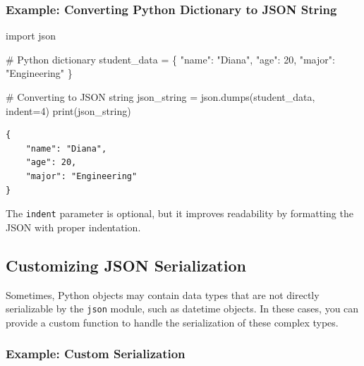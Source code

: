 \documentclass[
  letterpaper,
  DIV=11,
  numbers=noendperiod]{scrreprt}
\newenvironment{Shaded}{\begin{snugshade}}{\end{snugshade}}
\newcommand{\BuiltInTok}[1]{\textcolor[rgb]{0.00,0.23,0.31}{#1}}
\newcommand{\CommentTok}[1]{\textcolor[rgb]{0.37,0.37,0.37}{#1}}
\newcommand{\DecValTok}[1]{\textcolor[rgb]{0.68,0.00,0.00}{#1}}
\newcommand{\ImportTok}[1]{\textcolor[rgb]{0.00,0.46,0.62}{#1}}
\newcommand{\NormalTok}[1]{\textcolor[rgb]{0.00,0.23,0.31}{#1}}
\newcommand{\OperatorTok}[1]{\textcolor[rgb]{0.37,0.37,0.37}{#1}}
\newcommand{\StringTok}[1]{\textcolor[rgb]{0.13,0.47,0.30}{#1}}
\begin{document}
\hypertarget{example-converting-python-dictionary-to-json-string}{%
\subsubsection{Example: Converting Python Dictionary to JSON
String}\label{example-converting-python-dictionary-to-json-string}}

\begin{Shaded}
\begin{Highlighting}[]
\ImportTok{import}\NormalTok{ json}

\CommentTok{\# Python dictionary}
\NormalTok{student\_data }\OperatorTok{=}\NormalTok{ \{}
    \StringTok{"name"}\NormalTok{: }\StringTok{"Diana"}\NormalTok{,}
    \StringTok{"age"}\NormalTok{: }\DecValTok{20}\NormalTok{,}
    \StringTok{"major"}\NormalTok{: }\StringTok{"Engineering"}
\NormalTok{\}}

\CommentTok{\# Converting to JSON string}
\NormalTok{json\_string }\OperatorTok{=}\NormalTok{ json.dumps(student\_data, indent}\OperatorTok{=}\DecValTok{4}\NormalTok{)}
\BuiltInTok{print}\NormalTok{(json\_string)}
\end{Highlighting}
\end{Shaded}

\begin{verbatim}
{
    "name": "Diana",
    "age": 20,
    "major": "Engineering"
}
\end{verbatim}

The \texttt{indent} parameter is optional, but it improves readability
by formatting the JSON with proper indentation.

\hypertarget{customizing-json-serialization}{%
\subsection{Customizing JSON
Serialization}\label{customizing-json-serialization}}

Sometimes, Python objects may contain data types that are not directly
serializable by the \texttt{json} module, such as datetime objects. In
these cases, you can provide a custom function to handle the
serialization of these complex types.

\hypertarget{example-custom-serialization}{%
\subsubsection{Example: Custom
Serialization}\label{example-custom-serialization}}
\end{document}
